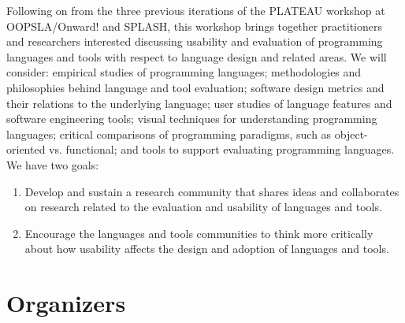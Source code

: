 \documentclass[10pt]{sigplanconf}
\begin{document}
Following on from the three previous iterations of the PLATEAU workshop at OOPSLA/Onward! 
and SPLASH, this workshop brings together practitioners and
researchers interested discussing usability and evaluation of
programming languages and tools with respect to language design and
related areas. We will consider: empirical studies of programming
languages; methodologies and philosophies behind language and tool
evaluation; software design metrics and their relations to the
underlying language; user studies of language features and software
engineering tools; visual techniques for understanding programming
languages; critical comparisons of programming paradigms, such as
object-oriented vs. functional; and tools to support evaluating
programming languages. We have two goals:

\begin{enumerate}
  \item 
Develop and sustain a research community that shares ideas and collaborates on 
research related to the evaluation and usability of languages and tools.
\item
Encourage the languages and tools communities to think more critically
about how usability affects the  design and adoption of languages and tools.
\end{enumerate}


\section{Organizers}
\end{document}
